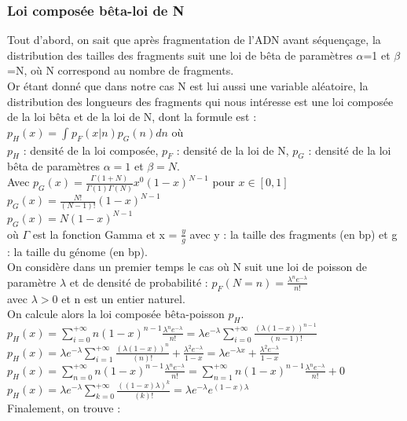 \documentclass[11pt,a4paper]{article} %
\begin{document}
\subsubsection{Loi composée bêta-loi de N}
Tout d'abord, on sait que après fragmentation de l'ADN avant séquençage, la distribution des tailles des fragments suit une loi de bêta de paramètres $\alpha$=1 et $\beta$=N, où N correspond au nombre de fragments.\\
Or étant donné que dans notre cas N est lui aussi une variable aléatoire, la distribution des longueurs des fragments qui nous intéresse est une loi composée de la loi bêta et de la loi de N, dont la formule est : \\
$p_{H}(x) = \int_{}^{}p_{F}(x|n)p_{G}(n)dn$ où \\
$p_{H}$ : densité de la loi composée, $p_{F}$ : densité de la loi de N, $p_{G}$ : densité de la loi bêta de paramètres $\alpha = 1$ et $\beta=N$. \\ 
Avec $p_{G}(x) = \frac{\Gamma(1+N)}{\Gamma(1)\Gamma(N)}x^0(1-x)^{N-1}$ pour $x\in[0,1]$\\
$ p_{G}(x) = \frac{N!}{(N-1)!}(1-x)^{N-1}$ \\
$ p_{G}(x) = N(1-x)^{N-1}$ \\
où $\Gamma$ est la fonction Gamma et x = $\frac{y}{g}$ avec y : la taille des fragments (en bp) et g : la taille du génome (en bp).\\
On considère dans un premier temps le cas où N suit une loi de poisson de paramètre $\lambda$ et de densité de probabilité : $p_{F}(N=n) =\frac{\lambda^{n}e^{-\lambda}}{n!}$ \\
avec $\lambda >0 $ et n est un entier naturel. \\
On calcule alors la loi composée bêta-poisson $p_{H}$.\\
$p_{H}(x) = \sum_{i=0}^{+\infty}n(1-x)^{n-1}\frac{\lambda^{n}e^{-\lambda}}{n!} = \lambda e^{-\lambda}\sum_{i=0}^{+\infty}\frac{(\lambda (1-x))^{n-1}}{(n-1)!}$ \\
$p_{H}(x)= \lambda e^{-\lambda}\sum_{i=1}^{+\infty}\frac{(\lambda (1-x))^{n}}{(n)!} + \frac{\lambda^{2}e^{-\lambda}}{1-x}=\lambda e^{-\lambda x} + \frac{\lambda^{2}e^{-\lambda}}{1-x}$ \\
$p_{H}(x) = \sum_{n=0}^{+\infty}n(1-x)^{n-1}\frac{\lambda^{n}e^{-\lambda}}{n!}  = \sum_{n=1}^{+\infty}n(1-x)^{n-1}\frac{\lambda^{n}e^{-\lambda}}{n!} + 0$ \\
$p_{H}(x) = \lambda e^{-\lambda}\sum_{k=0}^{+\infty}\frac{((1-x)\lambda)^{k}}{(k)!} =\lambda e^{-\lambda}e^{(1-x)\lambda}$ \\
Finalement, on trouve : \\
\end{document}
